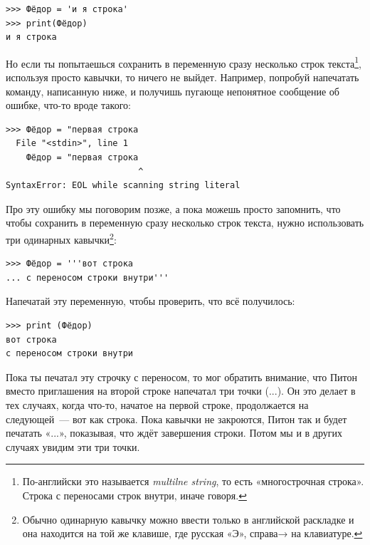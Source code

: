 \begin{listing}
\begin{verbatim}
>>> Фёдор = 'и я строка'
>>> print(Фёдор)
и я строка
\end{verbatim}
\end{listing}

Но если ты попытаешься сохранить в переменную сразу несколько строк текста\footnote{По-английски это называется \emph{multilne string}, то есть «многострочная строка». Строка с переносами строк внутри, иначе говоря.}, используя просто кавычки, то ничего не выйдет. Например, попробуй напечатать команду, написанную ниже, и получишь пугающе непонятное сообщение об ошибке, что-то вроде такого:

\begin{listing}
\begin{verbatim}
>>> Фёдор = "первая строка
  File "<stdin>", line 1
    Фёдор = "первая строка
                          ^
SyntaxError: EOL while scanning string literal
\end{verbatim}
\end{listing}

Про эту ошибку мы поговорим позже, а пока можешь просто запомнить, что чтобы сохранить в переменную сразу несколько строк текста, нужно использовать три одинарных кавычки\footnote{Обычно одинарную кавычку можно ввести только в английской раскладке и она находится на той же клавише, где русская «Э», справа→ на клавиатуре.}:

\begin{listing}
\begin{verbatim}
>>> Фёдор = '''вот строка
... с переносом строки внутри'''
\end{verbatim}
\end{listing}

Напечатай эту переменную, чтобы проверить, что всё получилось:

\begin{listing}
\begin{verbatim}
>>> print (Фёдор)
вот строка
с переносом строки внутри
\end{verbatim}
\end{listing}

Пока ты печатал эту строчку с переносом, то мог обратить внимание, что Питон вместо приглашения на второй строке напечатал три точки (...). Он это делает в тех случаях, когда что-то, начатое на первой строке, продолжается на следующей — вот как строка. Пока кавычки не закроются, Питон так и будет печатать «...», показывая, что ждёт завершения строки. Потом мы и в других случаях увидим эти три точки.

